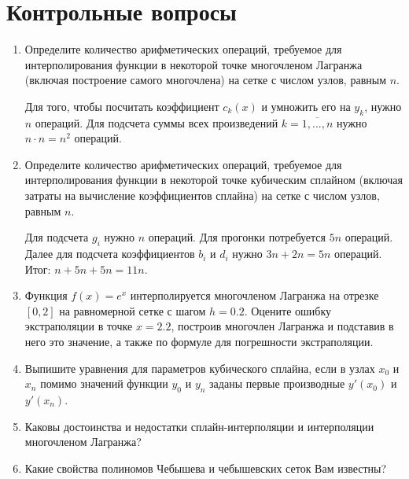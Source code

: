 \documentclass[12pt, a4paper]{article}
\begin{document}
\section{Контрольные вопросы}
\begin{enumerate}

\item Определите количество арифметических операций, требуемое для интерполирования функции в некоторой точке многочленом Лагранжа (включая построение самого многочлена) на сетке с числом узлов, равным $n$.

Для того, чтобы посчитать коэффициент $c_k(x)$ и умножить его на $y_k$, нужно $n$ операций. Для подсчета суммы всех произведений $k = \overline{1,..., n}$ нужно $n \cdot n = n^2$ операций.

\item Определите количество арифметических операций, требуемое для интерполирования функции в некоторой точке кубическим сплайном (включая затраты на вычисление коэффициентов сплайна) на сетке с числом узлов, равным $n$.

Для подсчета $g_i$ нужно $n$ операций. Для прогонки потребуется $5n$ операций. Далее для подсчета коэффициентов $b_i$ и $d_i$ нужно $3n + 2n = 5n$ операций. Итог: $n + 5n + 5n = 11n$.

\item Функция $f(x) = e^x$ интерполируется многочленом Лагранжа на отрезке $[0, 2]$ на равномерной сетке с шагом $h = 0{.}2$. Оцените ошибку экстраполяции в точке $x = 2{.}2$, построив многочлен Лагранжа и подставив в него это значение, а также по формуле для погрешности экстраполяции.

\item Выпишите уравнения для параметров кубического сплайна, если в узлах $x_0$ и $x_n$ помимо значений функции $y_0$ и $y_n$ заданы первые производные $y'(x_0)$ и $y'(x_n)$.

\item Каковы достоинства и недостатки сплайн-интерполяции и интерполяции многочленом Лагранжа?

\item Какие свойства полиномов Чебышева и чебышевских сеток Вам известны?

\end{enumerate}
\newpage
\end{document}
